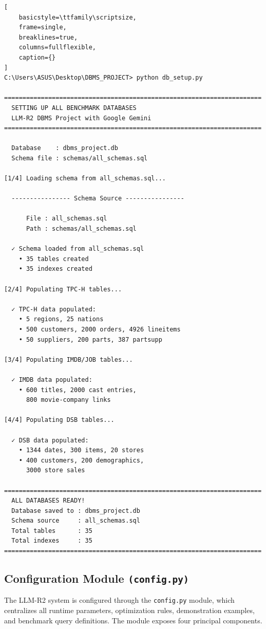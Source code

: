 \documentclass[12pt,a4paper]{article}
\begin{document}
\begin{lstlisting}[
    basicstyle=\ttfamily\scriptsize,
    frame=single,
    breaklines=true,
    columns=fullflexible,
    caption={}
]
C:\Users\ASUS\Desktop\DBMS_PROJECT> python db_setup.py

======================================================================
  SETTING UP ALL BENCHMARK DATABASES
  LLM-R2 DBMS Project with Google Gemini
======================================================================

  Database    : dbms_project.db
  Schema file : schemas/all_schemas.sql

[1/4] Loading schema from all_schemas.sql...

  ---------------- Schema Source ----------------

      File : all_schemas.sql
      Path : schemas/all_schemas.sql

  ✓ Schema loaded from all_schemas.sql
    • 35 tables created
    • 35 indexes created

[2/4] Populating TPC-H tables...

  ✓ TPC-H data populated:
    • 5 regions, 25 nations
    • 500 customers, 2000 orders, 4926 lineitems
    • 50 suppliers, 200 parts, 387 partsupp

[3/4] Populating IMDB/JOB tables...

  ✓ IMDB data populated:
    • 600 titles, 2000 cast entries,
      800 movie-company links

[4/4] Populating DSB tables...

  ✓ DSB data populated:
    • 1344 dates, 300 items, 20 stores
    • 400 customers, 200 demographics,
      3000 store sales

======================================================================
  ALL DATABASES READY!
  Database saved to : dbms_project.db
  Schema source     : all_schemas.sql
  Total tables      : 35
  Total indexes     : 35
======================================================================
\end{lstlisting}

\subsection{Configuration Module \texttt{(config.py)}}

The LLM-R2 system is configured through the \texttt{config.py} module, which centralizes all runtime parameters, optimization rules, demonstration examples, and benchmark query definitions. The module exposes four principal components.
\end{document}

